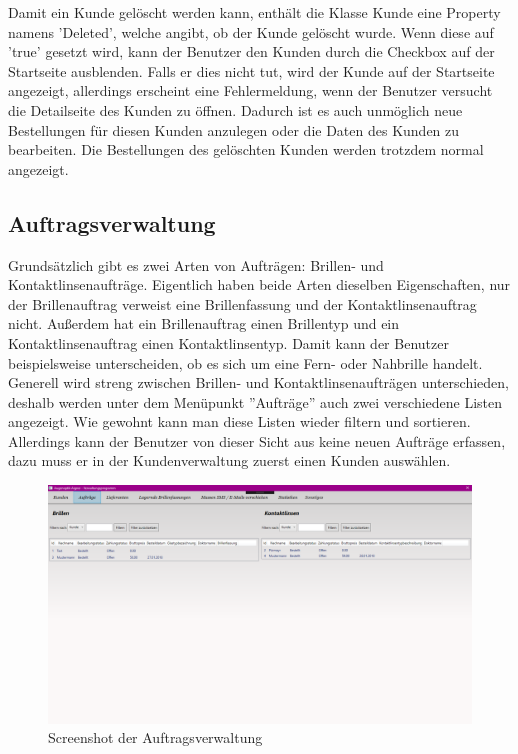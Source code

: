 Damit ein Kunde gelöscht werden kann, enthält die Klasse Kunde eine Property namens 'Deleted', welche angibt, ob der Kunde gelöscht wurde. Wenn diese auf 'true' gesetzt wird, kann der Benutzer den Kunden durch die Checkbox auf der Startseite ausblenden. Falls er dies nicht tut, wird der Kunde auf der Startseite angezeigt, allerdings erscheint eine Fehlermeldung, wenn der Benutzer versucht die Detailseite des Kunden zu öffnen. Dadurch ist es auch unmöglich neue Bestellungen für diesen Kunden anzulegen oder die Daten des Kunden zu bearbeiten. Die Bestellungen des gelöschten Kunden werden trotzdem normal angezeigt.
\subsection{Auftragsverwaltung}
Grundsätzlich gibt es zwei Arten von Aufträgen: Brillen- und Kontaktlinsenaufträge. Eigentlich haben beide Arten dieselben Eigenschaften, nur der Brillenauftrag verweist eine Brillenfassung und der Kontaktlinsenauftrag nicht. Außerdem hat ein Brillenauftrag einen Brillentyp und ein Kontaktlinsenauftrag einen Kontaktlinsentyp. Damit kann der Benutzer beispielsweise unterscheiden, ob es sich um eine Fern- oder Nahbrille handelt. Generell wird streng zwischen Brillen- und Kontaktlinsenaufträgen unterschieden, deshalb werden unter dem Menüpunkt ''Aufträge'' auch zwei verschiedene Listen angezeigt. Wie gewohnt kann man diese Listen wieder filtern und sortieren. Allerdings kann der Benutzer von dieser Sicht aus keine neuen Aufträge erfassen, dazu muss er in der Kundenverwaltung zuerst einen Kunden auswählen. 
\begin{figure}[H]
\begin{center}
	\includegraphics[scale=.25]{images/Auftraege.png}
\end{center}
	\caption{Screenshot der Auftragsverwaltung}
	\label{fig:sample}
\end{figure}
